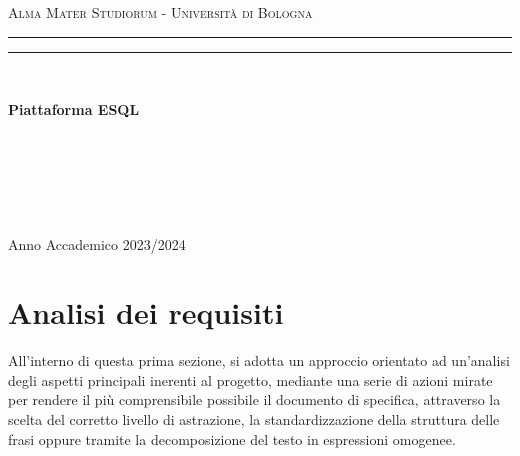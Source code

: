 \documentclass{article}
\begin{document}
\pagestyle{empty}

\begin{titlepage}
\begin{center}
    {{\Large{\textsc{Alma Mater Studiorum - Università di Bologna}}}}
    \rule[0.1cm]{\textwidth}{0.1px}
    \rule[0.5cm]{\textwidth}{0.6px}\\
    {}
\end{center}

\vspace{50px}

\begin{center}
    {\LARGE{{\bf Piattaforma ESQL}}}\\
\end{center}

\vspace{115px}
\par
\noindent
\begin{minipage}[t]{0.04\textwidth}
~
\end{minipage}
\begin{minipage}[t]{0.4\textwidth}
\end{minipage}
\hfill
\begin{minipage}[t]{0.4\textwidth}\raggedleft
    {\\
}
\end{minipage}
\begin{minipage}[t]{0.04\textwidth}
~
\end{minipage}

\vspace*{210px}

\begin{center}
    \large{Anno Accademico 2023/2024}
\end{center}
\end{titlepage}

\section{Analisi dei requisiti}
\setcounter{subsection}{1}
\large
All'interno di questa prima sezione, si adotta un approccio orientato ad un'analisi degli aspetti principali inerenti al progetto, mediante una serie di azioni mirate per rendere il più comprensibile possibile il documento di specifica, attraverso la scelta del corretto livello di astrazione, la standardizzazione della struttura delle frasi oppure tramite la decomposizione del testo in espressioni omogenee.
\end{document}
